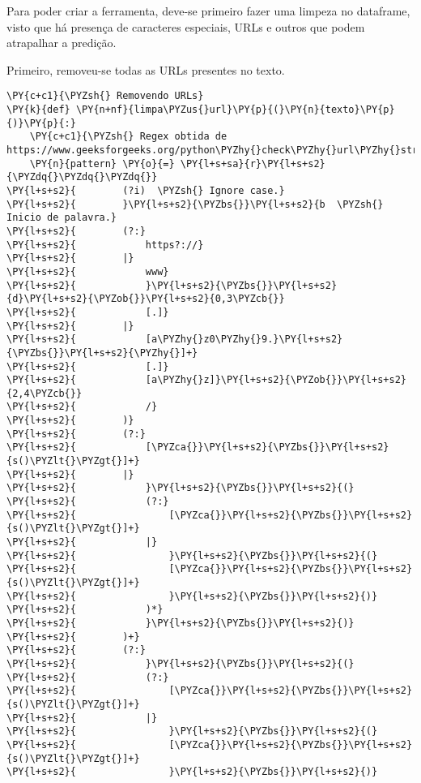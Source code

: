 \documentclass[a4paper,11pt,final]{article}
\begin{document}
Para poder criar a ferramenta, deve-se primeiro fazer uma limpeza no dataframe, visto que há presença de caracteres especiais, URLs e outros que podem atrapalhar a predição.

Primeiro, removeu-se todas as URLs presentes no texto.



\begin{Verbatim}[commandchars=\\\{\},frame=single,fontsize=\small, xleftmargin=0.5em]
\PY{c+c1}{\PYZsh{} Removendo URLs}
\PY{k}{def} \PY{n+nf}{limpa\PYZus{}url}\PY{p}{(}\PY{n}{texto}\PY{p}{)}\PY{p}{:}
    \PY{c+c1}{\PYZsh{} Regex obtida de https://www.geeksforgeeks.org/python\PYZhy{}check\PYZhy{}url\PYZhy{}string/}
    \PY{n}{pattern} \PY{o}{=} \PY{l+s+sa}{r}\PY{l+s+s2}{\PYZdq{}\PYZdq{}\PYZdq{}}
\PY{l+s+s2}{        (?i)  \PYZsh{} Ignore case.}
\PY{l+s+s2}{        }\PY{l+s+s2}{\PYZbs{}}\PY{l+s+s2}{b  \PYZsh{} Inicio de palavra.}
\PY{l+s+s2}{        (?:}
\PY{l+s+s2}{            https?://}
\PY{l+s+s2}{        |}
\PY{l+s+s2}{            www}
\PY{l+s+s2}{            }\PY{l+s+s2}{\PYZbs{}}\PY{l+s+s2}{d}\PY{l+s+s2}{\PYZob{}}\PY{l+s+s2}{0,3\PYZcb{}}
\PY{l+s+s2}{            [.]}
\PY{l+s+s2}{        |}
\PY{l+s+s2}{            [a\PYZhy{}z0\PYZhy{}9.}\PY{l+s+s2}{\PYZbs{}}\PY{l+s+s2}{\PYZhy{}]+}
\PY{l+s+s2}{            [.]}
\PY{l+s+s2}{            [a\PYZhy{}z]}\PY{l+s+s2}{\PYZob{}}\PY{l+s+s2}{2,4\PYZcb{}}
\PY{l+s+s2}{            /}
\PY{l+s+s2}{        )}
\PY{l+s+s2}{        (?:}
\PY{l+s+s2}{            [\PYZca{}}\PY{l+s+s2}{\PYZbs{}}\PY{l+s+s2}{s()\PYZlt{}\PYZgt{}]+}
\PY{l+s+s2}{        |}
\PY{l+s+s2}{            }\PY{l+s+s2}{\PYZbs{}}\PY{l+s+s2}{(}
\PY{l+s+s2}{            (?:}
\PY{l+s+s2}{                [\PYZca{}}\PY{l+s+s2}{\PYZbs{}}\PY{l+s+s2}{s()\PYZlt{}\PYZgt{}]+}
\PY{l+s+s2}{            |}
\PY{l+s+s2}{                }\PY{l+s+s2}{\PYZbs{}}\PY{l+s+s2}{(}
\PY{l+s+s2}{                [\PYZca{}}\PY{l+s+s2}{\PYZbs{}}\PY{l+s+s2}{s()\PYZlt{}\PYZgt{}]+}
\PY{l+s+s2}{                }\PY{l+s+s2}{\PYZbs{}}\PY{l+s+s2}{)}
\PY{l+s+s2}{            )*}
\PY{l+s+s2}{            }\PY{l+s+s2}{\PYZbs{}}\PY{l+s+s2}{)}
\PY{l+s+s2}{        )+}
\PY{l+s+s2}{        (?:}
\PY{l+s+s2}{            }\PY{l+s+s2}{\PYZbs{}}\PY{l+s+s2}{(}
\PY{l+s+s2}{            (?:}
\PY{l+s+s2}{                [\PYZca{}}\PY{l+s+s2}{\PYZbs{}}\PY{l+s+s2}{s()\PYZlt{}\PYZgt{}]+}
\PY{l+s+s2}{            |}
\PY{l+s+s2}{                }\PY{l+s+s2}{\PYZbs{}}\PY{l+s+s2}{(}
\PY{l+s+s2}{                [\PYZca{}}\PY{l+s+s2}{\PYZbs{}}\PY{l+s+s2}{s()\PYZlt{}\PYZgt{}]+}
\PY{l+s+s2}{                }\PY{l+s+s2}{\PYZbs{}}\PY{l+s+s2}{)}

\end{Verbatim}
\end{document}
